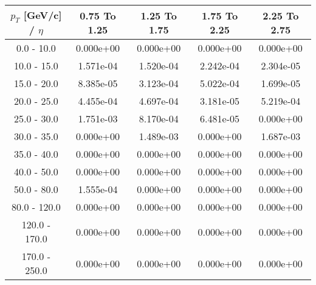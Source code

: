 \begin{tabular}{|c|c|c|c|c|}\hline 
$p_T$ [GeV/c] / $\eta$  & 0.75 To 1.25 & 1.25 To 1.75 & 1.75 To 2.25 & 2.25 To 2.75 \\ 
 \hline 
0.0 - 10.0 & 0.000e+00 & 0.000e+00 & 0.000e+00 & 0.000e+00 \\ 
10.0 - 15.0 & 1.571e-04 & 1.520e-04 & 2.242e-04 & 2.304e-05 \\ 
15.0 - 20.0 & 8.385e-05 & 3.123e-04 & 5.022e-04 & 1.699e-05 \\ 
20.0 - 25.0 & 4.455e-04 & 4.697e-04 & 3.181e-05 & 5.219e-04 \\ 
25.0 - 30.0 & 1.751e-03 & 8.170e-04 & 6.481e-05 & 0.000e+00 \\ 
30.0 - 35.0 & 0.000e+00 & 1.489e-03 & 0.000e+00 & 1.687e-03 \\ 
35.0 - 40.0 & 0.000e+00 & 0.000e+00 & 0.000e+00 & 0.000e+00 \\ 
40.0 - 50.0 & 0.000e+00 & 0.000e+00 & 0.000e+00 & 0.000e+00 \\ 
50.0 - 80.0 & 1.555e-04 & 0.000e+00 & 0.000e+00 & 0.000e+00 \\ 
80.0 - 120.0 & 0.000e+00 & 0.000e+00 & 0.000e+00 & 0.000e+00 \\ 
120.0 - 170.0 & 0.000e+00 & 0.000e+00 & 0.000e+00 & 0.000e+00 \\ 
170.0 - 250.0 & 0.000e+00 & 0.000e+00 & 0.000e+00 & 0.000e+00 \\ 
 \hline 
\end{tabular} 
